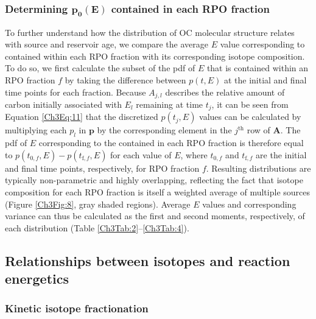 \subsubsection{Determining $\bm{p_{0}(E)}$ contained in each RPO fraction}

To further understand how the distribution of OC molecular structure relates with source and reservoir age, we compare the average $E$ value corresponding to  contained within each RPO fraction with its corresponding isotope composition. To do so, we first calculate the subset of the pdf of $E$ that is contained within an RPO fraction $f$ by taking the difference between $p(t,E)$ at the initial and final time points for each fraction. Because $A_{j,l}$ describes the relative amount of carbon initially associated with $E_{l}$ remaining at time $t_{j}$, it can be seen from Equation \ref{Ch3Eq:11} that the discretized $p(t_{j},E)$ values can be calculated by multiplying each $p_{l}$ in $\mathbf{p}$ by the corresponding element in the $j^{\text{th}}$ row of $\mathbf{A}$. The pdf of $E$ corresponding to the  contained in each RPO fraction is therefore equal to $p(t_{\text{0},f},E) - p(t_{\text{f},f},E)$ for each value of $E$, where $t_{\text{0},f}$ and $t_{\text{f},f}$ are the initial and final time points, respectively, for RPO fraction $f$. Resulting distributions are typically non-parametric and highly overlapping, reflecting the fact that  isotope composition for each RPO fraction is itself a weighted average of multiple sources (Figure \ref{Ch3Fig:8}, gray shaded regions). Average $E$ values and corresponding variance can thus be calculated as the first and second moments, respectively, of each distribution (Table \ref{Ch3Tab:2}--\ref{Ch3Tab:4}).

\subsection{Relationships between isotopes and reaction energetics}

\subsubsection{Kinetic isotope fractionation}

